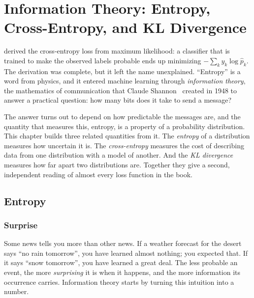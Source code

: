 \chapter{Information Theory: Entropy, Cross-Entropy, and KL Divergence}
\label{chap:ch07}


 derived the cross-entropy loss from maximum
likelihood: a classifier that is trained to make the observed labels
probable ends up minimizing $-\sum_k y_k \log \hat{p}_k$. The derivation
was complete, but it left the name unexplained. ``Entropy'' is a word
from physics, and it entered machine learning through \emph{information
theory}, the mathematics of communication that Claude
Shannon~\cite{shannon1948mathematical} created in 1948 to answer a
practical question: how many bits does it take to send a message?

The answer turns out to depend on how predictable the messages are, and
the quantity that measures this, entropy, is a property of a probability
distribution. This chapter builds three related quantities from it. The
\emph{entropy} of a distribution measures how uncertain it is. The
\emph{cross-entropy} measures the cost of describing data from one
distribution with a model of another. And the \emph{KL divergence}
measures how far apart two distributions are. Together they give a
second, independent reading of almost every loss function in the book.

\section{Entropy}
\label{sec:ch07-entropy}

\subsection{Surprise}
\label{sec:ch07-surprise}

Some news tells you more than other news. If a weather forecast for the
desert says ``no rain tomorrow'', you have learned almost nothing; you
expected that. If it says ``snow tomorrow'', you have learned a great
deal. The less probable an event, the more \emph{surprising} it is when
it happens, and the more information its occurrence carries. Information
theory starts by turning this intuition into a number.

